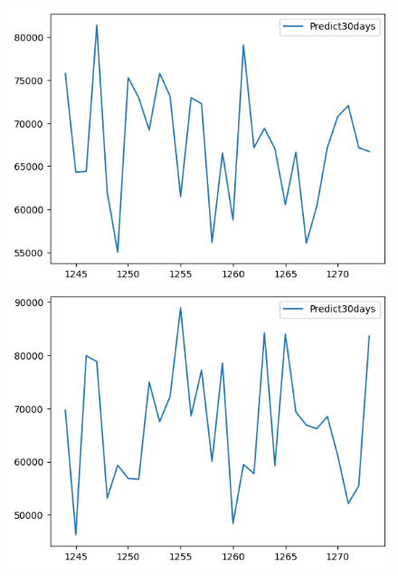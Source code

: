 \begin{figure}[H]
\begin{minipage}{0.15\textwidth}
    \includegraphics[width=1\textwidth]{resources/chapter-5/predicted/VCB_ML_8_2_next30days.png}
    \end{minipage}
    \hfill
        \begin{minipage}{0.15\textwidth}
    \centering
    \includegraphics[width=1\textwidth]{resources/chapter-5/predicted/VCB_ML_9_1_next30days.png}
    \end{minipage}
    \hfill
    \begin{minipage}{0.15\textwidth}
    \centering

\end{minipage}
\end{figure}
